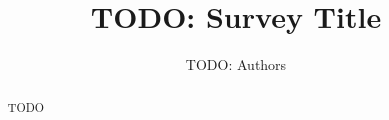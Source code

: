 \documentclass[11pt]{article}
\title{TODO: Survey Title}
\author{TODO: Authors}
\date{}
\begin{document}
\maketitle

\begin{abstract}
TODO
\end{abstract}

% 
% 
% 
% 
% 
% 

\clearpage


\end{document}
